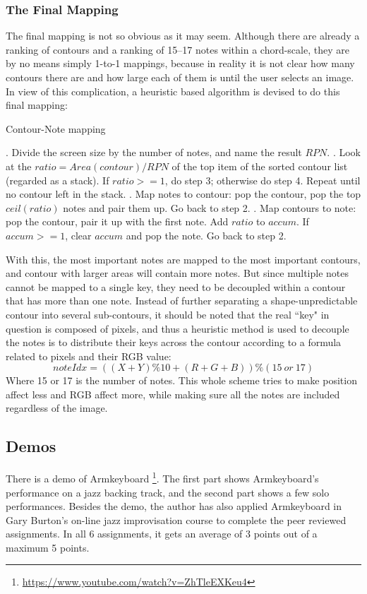 \subsubsection{The Final Mapping}
The final mapping is not so obvious as it may seem. Although there are already a ranking of contours and a ranking of 15--17 notes within a chord-scale, they are by no means simply 1-to-1 mappings, because in reality it is not clear how many contours there are and how large each of them is until the user selects an image. In view of this complication, a heuristic based algorithm is devised to do this final mapping:
\begin{algorithm}
\caption{Contour-Note mapping}
\begin{algorithmic}
. Divide the screen size by the number of notes, and name the result $RPN$.
. Look at the $ ratio = Area(contour) / RPN $ of the top item of the sorted contour list (regarded as a stack). \newline If $ratio>=1$, do step	3; otherwise do step 4. Repeat until no contour left in the stack.
. Map notes to contour: pop the contour, pop the top $ ceil(ratio)$ notes and pair them up. Go back to step 2.
. Map contours to note: pop the contour, pair it up with the first	note. Add $ratio$ to $accum$. If $accum>=1$, clear $accum$ and pop the note. Go back to step 2.
\end{algorithmic}
\end{algorithm}
With this, the most important notes are mapped to the most important contours, and contour with larger areas will contain more notes. But since multiple notes cannot be mapped to a single key, they need to be decoupled  within a contour that has more than one note. Instead of further separating a shape-unpredictable contour into several sub-contours, it should be noted that the real ``key" in question is composed of pixels, and thus a heuristic method is used to decouple the notes is to distribute their keys across the contour according to a formula related to pixels and their RGB value:
\begin{equation}
noteIdx = ((X + Y) \% 10 + (R + G + B)) \% (15\ or\ 17)
\end{equation}
Where 15 or 17 is the number of notes. This whole scheme tries to make position affect less
and RGB affect more, while making sure all the notes are included regardless of the image.

\subsection{Demos}
There is a demo of Armkeyboard \footnote{\url{https://www.youtube.com/watch?v=ZhTleEXKeu4}}. The first part shows Armkeyboard's performance on a jazz backing track, and the second part shows a few solo performances. Besides the demo, the author has also applied Armkeyboard in Gary Burton's on-line jazz improvisation course to complete the peer reviewed assignments. In all 6 assignments, it gets an average of 3 points out of a maximum 5 points.


